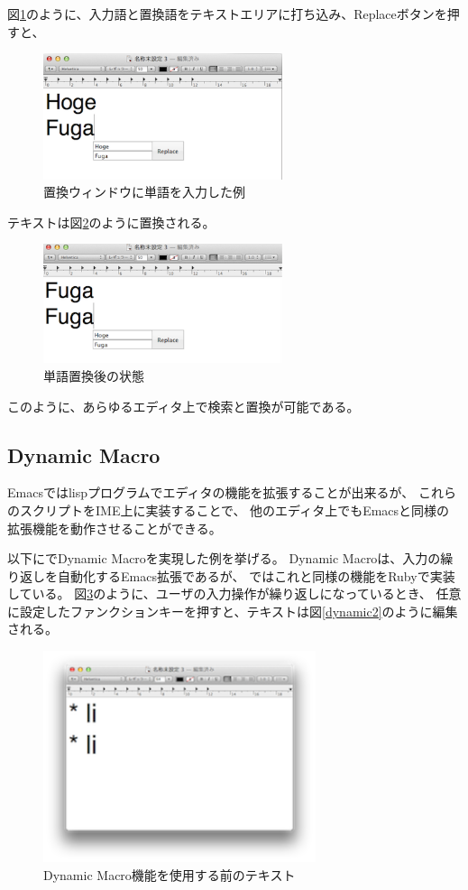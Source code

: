 図\ref{search2}のように、入力語と置換語をテキストエリアに打ち込み、Replaceボタンを押すと、

\begin{figure}[H]
\centerline{\includegraphics[width=70mm,bb=0 0 360 191]{figures/replace2.png}}
\caption{置換ウィンドウに単語を入力した例}
\label{search2}
\end{figure}


テキストは図\ref{search3}のように置換される。

\begin{figure}[H]
\centerline{\includegraphics[width=70mm,bb=0 0 360 191]{figures/replace3.png}}
\caption{単語置換後の状態}
\label{search3}
\end{figure}

このように、あらゆるエディタ上で検索と置換が可能である。

\subsection{Dynamic Macro}

Emacsではlispプログラムでエディタの機能を拡張することが出来るが、
これらのスクリプトをIME上に実装することで、
他のエディタ上でもEmacsと同様の拡張機能を動作させることができる。

以下に{\system}でDynamic Macro\cite{DynamicMacro}を実現した例を挙げる。
Dynamic Macroは、入力の繰り返しを自動化するEmacs拡張であるが、
{\system}ではこれと同様の機能をRubyで実装している。
図\ref{dynamic1}のように、ユーザの入力操作が繰り返しになっているとき、
任意に設定したファンクションキーを押すと、テキストは図\ref{dynamic2}のように編集される。

\begin{figure}[H]
\centerline{\includegraphics[width=80mm,bb=0 0 360 220]{figures/dynamic1.png}}
\caption{Dynamic Macro機能を使用する前のテキスト}
\label{dynamic1}
\end{figure}

